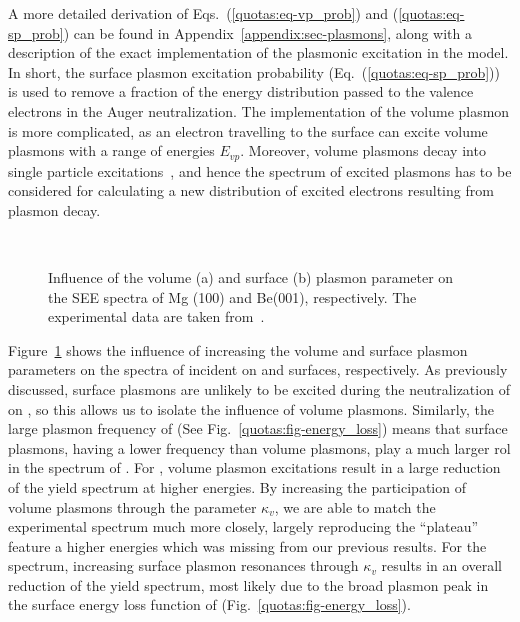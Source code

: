 \begin{refsection}
A more detailed derivation of Eqs.~(\ref{quotas:eq-vp_prob}) and 
(\ref{quotas:eq-sp_prob}) can be found in Appendix~\ref{appendix:sec-plasmons},
along with a description of the exact implementation of the plasmonic 
excitation in the model. In short, the surface plasmon excitation probability 
(Eq.~(\ref{quotas:eq-sp_prob})) is used to remove a fraction of the energy 
distribution passed to the valence electrons in the Auger neutralization. The 
implementation of the volume plasmon is more complicated, as an electron 
travelling to the surface can excite volume plasmons with a range of energies 
$E_{vp}$. Moreover, volume plasmons decay into single particle 
excitations~\cite{Baragiola1996}, and hence the spectrum of excited 
plasmons has to be considered for calculating a new distribution of excited 
electrons resulting from plasmon decay. 
 
\begin{figure}[ht] 
    \centering 
    \begin{subfigure}[t]{0.49\textwidth} 
        \centering 
         
        \caption{} 
    \end{subfigure}%
    ~  
    \begin{subfigure}[t]{0.49\textwidth} 
        \centering 
         
        \caption{} 
    \end{subfigure} 
\caption{Influence of the volume (a)  and surface (b) plasmon parameter on the 
SEE spectra of Mg (100) and Be(001), respectively. The experimental data are 
taken from~\cite{Baragiola2001}.} 
\label{quotas:fig-plasmon_influence} 
\end{figure} 
 
Figure~\ref{quotas:fig-plasmon_influence} shows the influence of increasing 
the volume and surface plasmon parameters on the spectra of  incident 
on  and  surfaces, respectively. As previously 
discussed, surface plasmons are unlikely to be excited during the neutralization 
of  on , so this allows us to isolate the influence of volume plasmons. 
Similarly, the large plasmon frequency of  
(See Fig.~\ref{quotas:fig-energy_loss}) means that surface plasmons, 
having a lower frequency than volume plasmons, play a much larger rol in the 
spectrum of . For , volume 
plasmon excitations result in a large reduction of the yield spectrum at 
higher energies. By increasing the participation of volume plasmons through 
the parameter $\kappa_v$, we are able to match the experimental spectrum much 
more closely, largely reproducing the ``plateau'' feature a higher energies 
which was missing from our previous results. For the  spectrum, 
increasing surface plasmon resonances through $\kappa_v$ results in an overall 
reduction of the yield spectrum, most likely due to the broad plasmon peak in 
the surface energy loss function of  (Fig.~\ref{quotas:fig-energy_loss}). 


\end{refsection}
